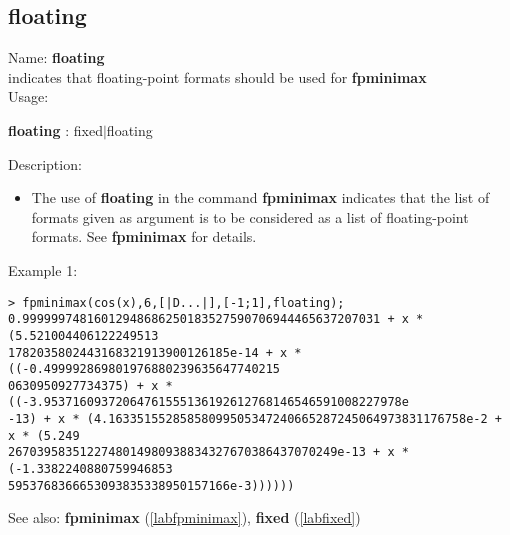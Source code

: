\subsection{floating}
\label{labfloating}
\noindent Name: \textbf{floating}\\
indicates that floating-point formats should be used for \textbf{fpminimax}\\

\noindent Usage: 
\begin{center}
\textbf{floating} : \textsf{fixed$|$floating}\\
\end{center}
\noindent Description: \begin{itemize}

\item The use of \textbf{floating} in the command \textbf{fpminimax} indicates that the list of
   formats given as argument is to be considered as a list of floating-point
   formats.
   See \textbf{fpminimax} for details.
\end{itemize}
\noindent Example 1: 
\begin{center}\begin{minipage}{15cm}\begin{Verbatim}[frame=single]
> fpminimax(cos(x),6,[|D...|],[-1;1],floating);
0.99999974816012948686250183527590706944465637207031 + x * (5.521004406122249513
1782035802443168321913900126185e-14 + x * ((-0.499992869801976880239635647740215
0630950927734375) + x * ((-3.95371609372064761555136192612768146546591008227978e
-13) + x * (4.16335155285858099505347240665287245064973831176758e-2 + x * (5.249
2670395835122748014980938834327670386437070249e-13 + x * (-1.3382240880759946853
5953768366653093835338950157166e-3))))))
\end{Verbatim}
\end{minipage}\end{center}
See also: \textbf{fpminimax} (\ref{labfpminimax}), \textbf{fixed} (\ref{labfixed})
